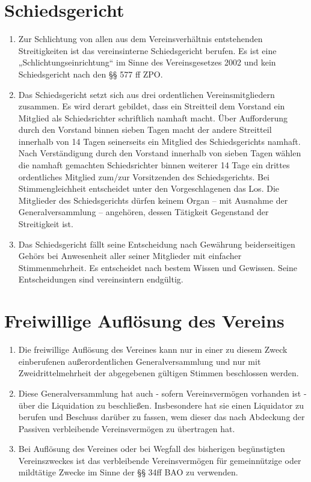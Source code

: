 \documentclass[a4paper,12pt]{article}
\begin{document}
\section{Schiedsgericht} %
\begin{enumerate}
\item Zur Schlichtung von allen aus dem Vereinsverhältnis entstehenden Streitigkeiten ist das vereinsinterne Schiedsgericht berufen. Es ist eine „Schlichtungseinrichtung“ im Sinne des Vereinsgesetzes 2002 und kein Schiedsgericht nach den §§ 577 ff ZPO.
\item Das Schiedsgericht setzt sich aus drei ordentlichen Vereinsmitgliedern zusammen. Es wird derart gebildet, dass ein Streitteil dem Vorstand ein Mitglied als Schiedsrichter schriftlich namhaft macht. Über Aufforderung durch den Vorstand binnen sieben Tagen macht der andere Streitteil innerhalb von 14 Tagen seinerseits ein Mitglied des Schiedsgerichts namhaft. Nach Verständigung durch den Vorstand innerhalb von sieben Tagen wählen die namhaft gemachten Schiedsrichter binnen weiterer 14 Tage ein drittes ordentliches Mitglied zum/zur Vorsitzenden des Schiedsgerichts. Bei Stimmengleichheit entscheidet unter den Vorgeschlagenen das Los. Die Mitglieder des Schiedsgerichts dürfen keinem Organ – mit Ausnahme der Generalversammlung – angehören, dessen Tätigkeit Gegenstand der Streitigkeit ist.
\item Das Schiedsgericht fällt seine Entscheidung nach Gewährung beiderseitigen Gehörs bei Anwesenheit aller seiner Mitglieder mit einfacher Stimmenmehrheit. Es entscheidet nach bestem Wissen und Gewissen. Seine Entscheidungen sind vereinsintern endgültig.
\end{enumerate}

\section{Freiwillige Auflösung des Vereins} %
\begin{enumerate}
\item Die freiwillige Auflösung des Vereines kann nur in einer zu diesem Zweck einberufenen außerordentlichen Generalversammlung und nur mit Zweidrittelmehrheit der abgegebenen gültigen Stimmen beschlossen werden.
\item Diese Generalversammlung hat auch - sofern Vereinsvermögen vorhanden ist - über die Liquidation zu beschließen. Insbesondere hat sie einen Liquidator zu berufen und Beschuss darüber zu fassen, wem dieser das nach Abdeckung der Passiven verbleibende Vereinsvermögen zu übertragen hat.
\item Bei Auflösung des Vereines oder bei Wegfall des bisherigen begünstigten Vereinszweckes ist das verbleibende Vereinsvermögen für gemeinnützige oder mildtätige Zwecke im Sinne der §§ 34ff BAO zu verwenden.
\end{enumerate}
\end{document}
